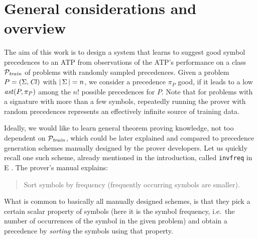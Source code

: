 \documentclass{ceurart}
\begin{document}



\section{General considerations and overview} \label{sect:overview}

The aim of this work is to design a system that learns to suggest good symbol precedences to an ATP 
from observations of the ATP's performance on a class \(\mathcal{P}_{\mathit{train}}\) of problems with randomly sampled precedences. 
Given a problem \(P = (\operatorname{\Sigma},\operatorname{\mathit{Cl}})\) with \(|\operatorname{\Sigma}|=n\), we consider a precedence \(\pi_P\) good,
if it leads to a low \(\operatorname{\mathit{ast}}(P,\pi_P)\)
among the $n!$ possible precedences for \(P\).
Note that for problems with a signature with more than a few symbols, repeatedly running the prover 
with random precedences represents an effectively infinite source of training data.

Ideally, we would like to learn general theorem proving knowledge, not too dependent on $\mathcal{P}_{\mathit{train}}$,
which could be later explained and compared to precedence generation schemes manually designed 
by the prover developers. Let us quickly recall one such scheme, already mentioned in the introduction,
called \texttt{invfreq} in E \cite{SCV:CADE-2019}. The prover's manual \cite{E-manual} explains:
\begin{quote}
Sort symbols by frequency (frequently occurring symbols are smaller).
\end{quote}
What is common to basically all manually designed schemes, is that they pick a certain scalar property of symbols 
(here it is the symbol frequency, i.e.~the number of occurrences of the symbol in the given problem)
and obtain a precedence by \emph{sorting} the symbols using that property.
\end{document}
